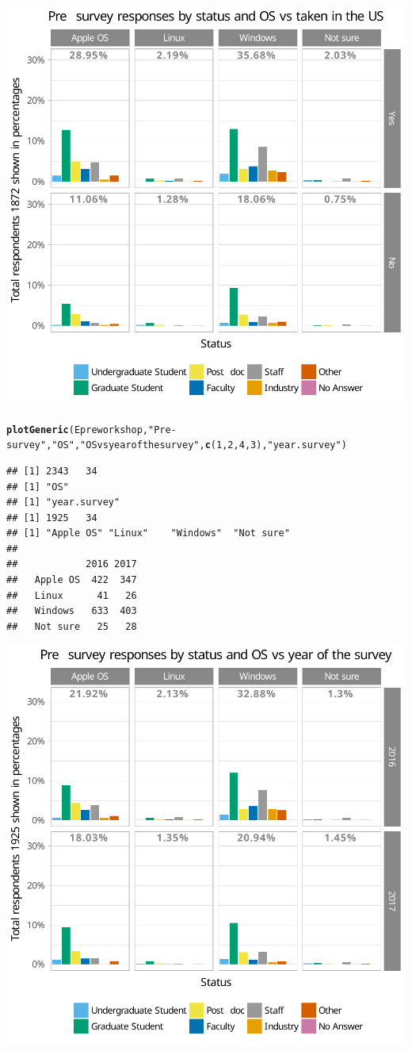 \documentclass{article}\usepackage[]{graphicx}\usepackage[]{color}
\makeatletter
\newcommand{\hlnum}[1]{\textcolor[rgb]{0.686,0.059,0.569}{#1}}%
\newcommand{\hlstr}[1]{\textcolor[rgb]{0.192,0.494,0.8}{#1}}%
\newcommand{\hlstd}[1]{\textcolor[rgb]{0.345,0.345,0.345}{#1}}%
\newcommand{\hlkwd}[1]{\textcolor[rgb]{0.737,0.353,0.396}{\textbf{#1}}}%
\newenvironment{kframe}{%
 \def\at@end@of@kframe{}%
 \ifinner\ifhmode%
  \def\at@end@of@kframe{\end{minipage}}%
  \begin{minipage}{\columnwidth}%
 \fi\fi%
 \def\FrameCommand##1{\hskip\@totalleftmargin \hskip-\fboxsep
 \colorbox{shadecolor}{##1}\hskip-\fboxsep
     \hskip-\linewidth \hskip-\@totalleftmargin \hskip\columnwidth}%
 \MakeFramed {\advance\hsize-\width
   \@totalleftmargin\z@ \linewidth\hsize
   \@setminipage}}%
 {\par\unskip\endMakeFramed%
 \at@end@of@kframe}
\newenvironment{knitrout}{}{} %
\makeatother
\begin{document}
\begin{knitrout}
{\centering \includegraphics[width=.6\linewidth]{figure/calls-Rnwplotting-presurvey-data-14} 

}


\begin{kframe}\begin{alltt}
\hlkwd{plotGeneric}\hlstd{(Epreworkshop,} \hlstr{"Pre-survey"}\hlstd{,} \hlstr{"OS"}\hlstd{,} \hlstr{"OS vs year of the survey"}\hlstd{,} \hlkwd{c}\hlstd{(}\hlnum{1}\hlstd{,}\hlnum{2}\hlstd{,}\hlnum{4}\hlstd{,}\hlnum{3}\hlstd{),} \hlstr{"year.survey"} \hlstd{)}
\end{alltt}
\begin{verbatim}
## [1] 2343   34
## [1] "OS"
## [1] "year.survey"
## [1] 1925   34
## [1] "Apple OS" "Linux"    "Windows"  "Not sure"
##           
##            2016 2017
##   Apple OS  422  347
##   Linux      41   26
##   Windows   633  403
##   Not sure   25   28
\end{verbatim}
\end{kframe}

{\centering \includegraphics[width=.6\linewidth]{figure/calls-Rnwplotting-presurvey-data-15} 

}



\end{knitrout}
\end{document}
